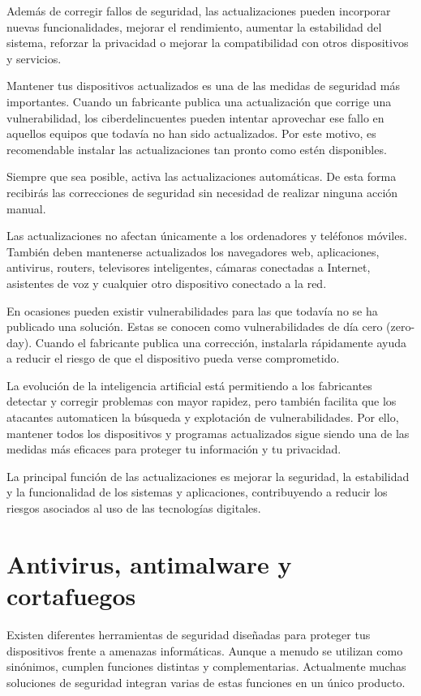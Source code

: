 \documentclass[
  spanish,
  a4paper,
  openany]{book}
\begin{document}
Además de corregir fallos de seguridad, las actualizaciones pueden incorporar nuevas funcionalidades, mejorar el rendimiento, aumentar la estabilidad del sistema, reforzar la privacidad o mejorar la compatibilidad con otros dispositivos y servicios.

Mantener tus dispositivos actualizados es una de las medidas de seguridad más importantes. Cuando un fabricante publica una actualización que corrige una vulnerabilidad, los ciberdelincuentes pueden intentar aprovechar ese fallo en aquellos equipos que todavía no han sido actualizados. Por este motivo, es recomendable instalar las actualizaciones tan pronto como estén disponibles.

Siempre que sea posible, activa las actualizaciones automáticas. De esta forma recibirás las correcciones de seguridad sin necesidad de realizar ninguna acción manual.

Las actualizaciones no afectan únicamente a los ordenadores y teléfonos móviles. También deben mantenerse actualizados los navegadores web, aplicaciones, antivirus, routers, televisores inteligentes, cámaras conectadas a Internet, asistentes de voz y cualquier otro dispositivo conectado a la red.

En ocasiones pueden existir vulnerabilidades para las que todavía no se ha publicado una solución. Estas se conocen como vulnerabilidades de día cero (zero-day). Cuando el fabricante publica una corrección, instalarla rápidamente ayuda a reducir el riesgo de que el dispositivo pueda verse comprometido.

La evolución de la inteligencia artificial está permitiendo a los fabricantes detectar y corregir problemas con mayor rapidez, pero también facilita que los atacantes automaticen la búsqueda y explotación de vulnerabilidades. Por ello, mantener todos los dispositivos y programas actualizados sigue siendo una de las medidas más eficaces para proteger tu información y tu privacidad.

La principal función de las actualizaciones es mejorar la seguridad, la estabilidad y la funcionalidad de los sistemas y aplicaciones, contribuyendo a reducir los riesgos asociados al uso de las tecnologías digitales.

\section{Antivirus, antimalware y cortafuegos}\label{antivirus-antimalware-y-cortafuegos}

Existen diferentes herramientas de seguridad diseñadas para proteger tus dispositivos frente a amenazas informáticas. Aunque a menudo se utilizan como sinónimos, cumplen funciones distintas y complementarias. Actualmente muchas soluciones de seguridad integran varias de estas funciones en un único producto.
\end{document}
